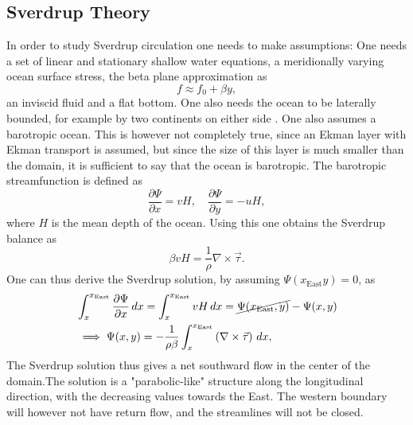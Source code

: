 \subsection{Sverdrup Theory}
In order to study Sverdrup circulation one needs to make assumptions: One needs a set of linear and stationary shallow water equations, a meridionally varying ocean surface stress, the beta plane approximation as 
\begin{equation}
    f \approx f_0 + \beta y,
\end{equation} 
an inviscid fluid and a flat bottom. One also needs the ocean to be laterally bounded, for example by two continents on either side \citep{Vallis06}. One also assumes a barotropic ocean. This is however not completely true, since an Ekman layer with Ekman transport is assumed, but since the size of this layer is much smaller than the domain, it is sufficient to say that the ocean is barotropic. The barotropic streamfunction is defined as 
\begin{equation}
    \frac{\partial \Psi}{\partial x}=vH, \quad \frac{\partial \Psi}{\partial 
    y}=-uH,
\end{equation}
where $H$ is the mean depth of the ocean. Using this one obtains the Sverdrup balance as 
\begin{equation}
    \beta v H = \frac{1}{\rho}\nabla\times\vec{\tau}.
\end{equation}
One can thus derive the Sverdrup solution, by assuming $\Psi(x_\text{East}y)=0$, as
\begin{align}
    &\int_x^{x_\text{East}}\frac{\partial \Psi}{\partial x}\, dx = \int_x^{x_\text{East}} vH \, dx =
\cancel{\Psi(x_\text{East},y)} - \Psi(x,y) \\
    &\implies \Psi(x,y) = -\frac{1}{\rho\beta}\int_x^{x_\text{East}} \left(\nabla\times\vec{\tau}\right) \, dx,
    \label{eq:theory}
\end{align}
The Sverdrup solution thus gives a net southward flow in the center of the domain.The solution is a "parabolic-like" structure along the longitudinal direction, with the decreasing values towards the East. The western boundary will however not have return flow, and the streamlines will not be closed.

